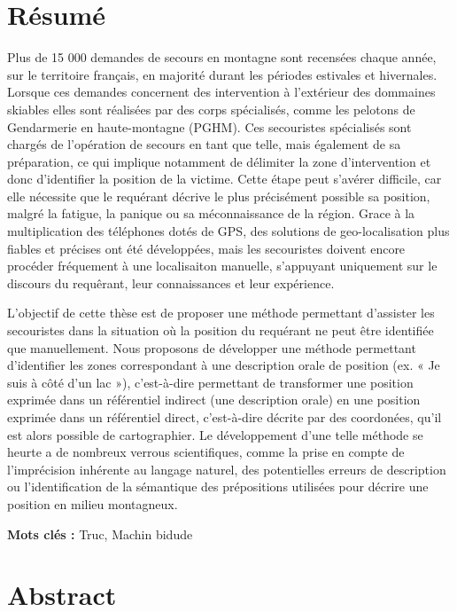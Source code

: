 \section*{Résumé}

Plus de 15 000 demandes de secours en montagne sont recensées chaque
année, sur le territoire français, en majorité durant les périodes
estivales et hivernales. Lorsque ces demandes concernent des
intervention à l'extérieur des dommaines skiables elles sont réalisées
par des corps spécialisés, comme les pelotons de Gendarmerie en
haute-montagne (PGHM). Ces secouristes spécialisés sont chargés de
l'opération de secours en tant que telle, mais également de sa
préparation, ce qui implique notamment de délimiter la zone
d'intervention et donc d'identifier la position de la victime. Cette
étape peut s'avérer difficile, car elle nécessite que le requérant
décrive le plus précisément possible sa position, malgré la fatigue,
la panique ou sa méconnaissance de la région. Grace à la
multiplication des téléphones dotés de GPS, des solutions de
geo-localisation plus fiables et précises ont été développées, mais
les secouristes doivent encore procéder fréquement à une localisaiton
manuelle, s'appuyant uniquement sur le discours du requêrant, leur
connaissances et leur expérience.

L'objectif de cette thèse est de proposer une méthode permettant
d'assister les secouristes dans la situation où la position du
requérant ne peut être identifiée que manuellement. Nous proposons de
développer une méthode permettant d'identifier les zones correspondant
à une description orale de position (ex. « Je suis à côté d'un lac »),
c'est-à-dire permettant de transformer une position exprimée dans un
référentiel indirect (une description orale) en une position exprimée
dans un référentiel direct, c'est-à-dire décrite par des coordonées,
qu'il est alors possible de cartographier. Le développement d'une
telle méthode se heurte a de nombreux verrous scientifiques, comme la
prise en compte de l'imprécision inhérente au langage naturel, des
potentielles erreurs de description ou l’identification de la
sémantique des prépositions utilisées pour décrire une position en
milieu montagneux.

\vspace{.5cm}

\noindent\textbf{Mots clés :} Truc, Machin bidude\par

\section*{Abstract}

